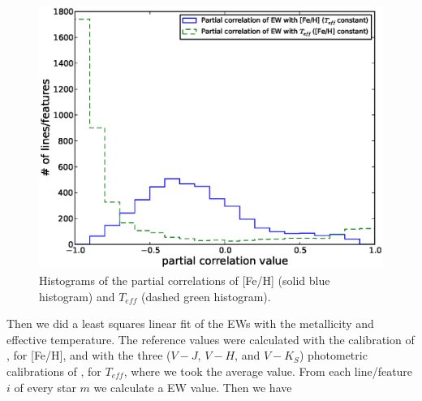 \documentclass{aa}
\begin{document}
\begin{figure}[h]
\begin{center}
\includegraphics[scale=0.45]{pics/pcorrv2.eps}
\end{center}
\caption{Histograms of the partial correlations of [Fe/H] (solid blue histogram) and $T_{eff}$ (dashed green histogram).}
\label{fig:pcorr}
\end{figure}


Then we did a least squares linear fit of the EWs with the metallicity and effective temperature. The reference values were calculated with the calibration of \citet{Neves-2012}, for [Fe/H], and with the three ($V-J$, $V-H$, and $V-K_{S}$) photometric calibrations of \citet{Casagrande-2008}, for $T_{eff}$, where we took the average value. From each line/feature $i$ of every star $m$ we calculate a EW value. Then we have
\end{document}
